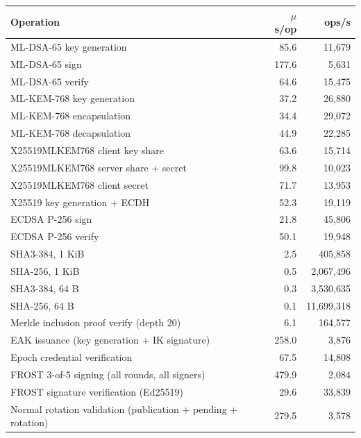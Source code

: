 \begin{tabular}{lrr}
\toprule
Operation & $\mu$s/op & ops/s \\
\midrule
ML-DSA-65 key generation & 85.6 & 11{,}679 \\
ML-DSA-65 sign & 177.6 & 5{,}631 \\
ML-DSA-65 verify & 64.6 & 15{,}475 \\
ML-KEM-768 key generation & 37.2 & 26{,}880 \\
ML-KEM-768 encapsulation & 34.4 & 29{,}072 \\
ML-KEM-768 decapsulation & 44.9 & 22{,}285 \\
X25519MLKEM768 client key share & 63.6 & 15{,}714 \\
X25519MLKEM768 server share + secret & 99.8 & 10{,}023 \\
X25519MLKEM768 client secret & 71.7 & 13{,}953 \\
X25519 key generation + ECDH & 52.3 & 19{,}119 \\
ECDSA P-256 sign & 21.8 & 45{,}806 \\
ECDSA P-256 verify & 50.1 & 19{,}948 \\
SHA3-384, 1 KiB & 2.5 & 405{,}858 \\
SHA-256, 1 KiB & 0.5 & 2{,}067{,}496 \\
SHA3-384, 64 B & 0.3 & 3{,}530{,}635 \\
SHA-256, 64 B & 0.1 & 11{,}699{,}318 \\
Merkle inclusion proof verify (depth 20) & 6.1 & 164{,}577 \\
EAK issuance (key generation + IK signature) & 258.0 & 3{,}876 \\
Epoch credential verification & 67.5 & 14{,}808 \\
FROST 3-of-5 signing (all rounds, all signers) & 479.9 & 2{,}084 \\
FROST signature verification (Ed25519) & 29.6 & 33{,}839 \\
Normal rotation validation (publication + pending + rotation) & 279.5 & 3{,}578 \\
\bottomrule
\end{tabular}
